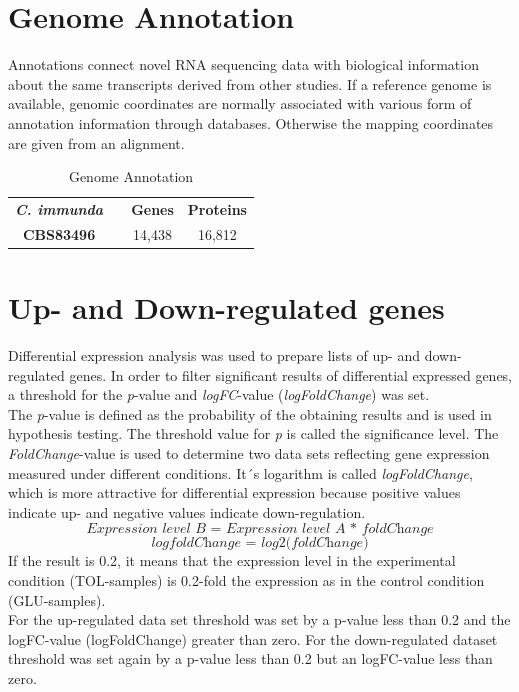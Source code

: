 \documentclass[12pt, a4paper]{report}
\newcommand{\HT}[1]{\textcolor{red}{#1}}
\begin{document}
\section{Genome Annotation}
Annotations connect novel RNA sequencing data with biological information about the same transcripts derived from other studies. If a reference genome is available, genomic coordinates are normally associated with various form of annotation information through databases. Otherwise the mapping coordinates are given from an alignment. 
\begin{table}[H]
	\centering
\begin{tabular}{c c c|c}
	\textbf{\textit{C. immunda}} & & \textbf{Genes} & \textbf{Proteins} \\
	\textbf{CBS83496}& & 14,438 & 16,812   \\ 
	
	
\end{tabular}
\caption{Genome Annotation}
\end{table}

\section{Up- and Down-regulated genes}
Differential expression analysis was used to prepare lists of up- and down-regulated genes. In order to filter significant results of differential expressed genes, a threshold for the \textit{p}-value and \textit{logFC}-value (\textit{logFoldChange}) was set. \\
The \textit{p}-value is defined as the probability of the obtaining results and is used in hypothesis testing. The threshold value for \textit{p} is called the significance level. The \textit{FoldChange}-value is used to determine two data sets reflecting gene expression measured under different conditions. It´s logarithm is called \textit{logFoldChange}, which is more attractive for differential expression because positive values indicate up- and negative values indicate down-regulation. 
\[
\textit{Expression level B = Expression level A * foldChange}
\]
\[
\textit{logfoldChange = log2(foldChange)}
\]
If the result is 0.2, it means that the expression level in the experimental condition (TOL-samples) is 0.2-fold the expression as in the control condition (GLU-samples). \\
For the up-regulated data set threshold was set by a p-value less than 0.2 and the logFC-value (logFoldChange) greater than zero. For the down-regulated dataset threshold was set again by a p-value less than 0.2 but an logFC-value less than zero. \\
\end{document}
